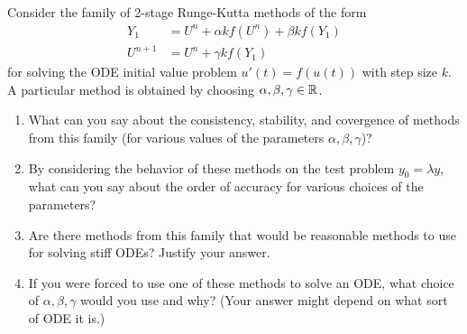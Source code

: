 \documentclass[10pt]{article}
\begin{document}
\begin{problem}
Consider the family of 2-stage Runge-Kutta methods of the form
\begin{align*}
    Y_1 &= U^n + \alpha k f(U^n) + \beta k f(Y_1) \\
    U^{n+1} &= U^n + \gamma k f(Y_1)
\end{align*}
    for solving the ODE initial value problem \( u'(t) = f(u(t)) \) with step size \( k \). A particular method is obtained by choosing \( \alpha, \beta,\gamma \in \mathbb{R} \).
\begin{enumerate}[nolistsep, label=(\alph*)]
    \item What can you say about the consistency, stability, and covergence of methods from this family (for various values of the parameters \( \alpha,\beta,\gamma \))?
    \item By considering the behavior of these methods on the test problem \( y_0 = \lambda y \), what can you say about the order of accuracy for various choices of the parameters?
    \item Are there methods from this family that would be reasonable methods to use for solving stiff ODEs? Justify your answer.
    \item If you were forced to use one of these methods to solve an ODE, what choice of \( \alpha, \beta,\gamma \) would you use and why? (Your answer might depend on what sort of ODE it is.)
\end{enumerate}
\end{problem}
\end{document}
